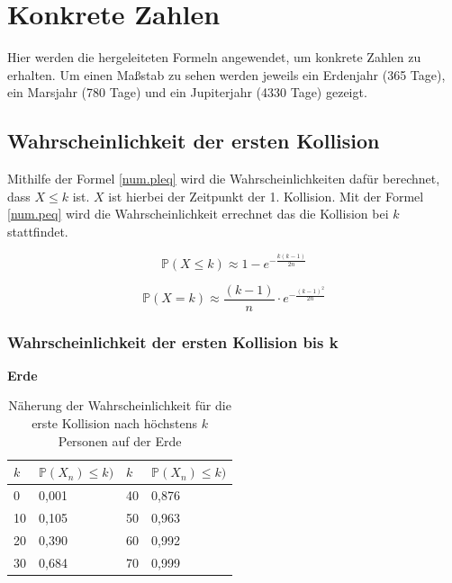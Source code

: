 \documentclass[../main.tex]{subfiles}
\begin{document}
    \section{Konkrete Zahlen}
    Hier werden die hergeleiteten Formeln angewendet, um konkrete Zahlen zu erhalten.
    Um einen Maßstab zu sehen werden jeweils ein Erdenjahr (365 Tage), ein Marsjahr (780 Tage) und ein Jupiterjahr (4330 Tage) gezeigt.

    \subsection{Wahrscheinlichkeit der ersten Kollision}

    Mithilfe der Formel \ref{num.pleq} wird die Wahrscheinlichkeiten dafür berechnet, dass $X \leq k$ ist. $X$ ist hierbei der
    Zeitpunkt der 1. Kollision.
    Mit der Formel \ref{num.peq} wird die Wahrscheinlichkeit errechnet das die Kollision bei $k$ stattfindet.

    \begin{equation}
        \mathbb{P}(X \leq k) \approx 1 - e^{- \frac{k(k-1)}{2n}}
        \label{num.pleq}
    \end{equation}

    \begin{equation}
        \mathbb{P}(X = k) \approx \frac{(k-1)}{n} \cdot e^{- \frac{(k-1)^2}{2n}}
        \label{num.peq}
    \end{equation}

    \subsubsection{Wahrscheinlichkeit der ersten Kollision bis k}

    \textbf{Erde}

    \begin{table}[h]
        \centering
        \begin{tabular}{|l|l|l|l|}
            \hline
            $k$ & $\mathbb{P}(X_{n}) \leq k)$ & $k$ & $\mathbb{P}(X_{n}) \leq k)$ \\ \hline
            0   & 0,001                       & 40  & 0,876                       \\
            10  & 0,105                       & 50  & 0,963                       \\
            20  & 0,390                       & 60  & 0,992                       \\
            30  & 0,684                       & 70  & 0,999                       \\ \hline
        \end{tabular}
        \caption{\label{num.tpe} Näherung der Wahrscheinlichkeit für die erste Kollision nach höchstens $k$ Personen auf der Erde}
    \end{table}
\end{document}
